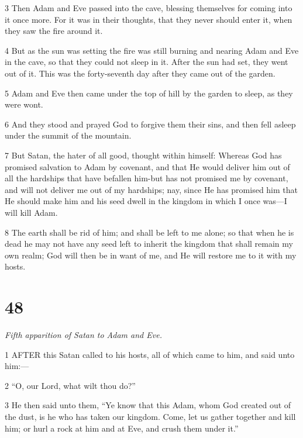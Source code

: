\par 3 Then Adam and Eve passed into the cave, blessing themselves for coming into it once more. For it was in their thoughts, that they never should enter it, when they saw the fire around it.

\par 4 But as the sun was setting the fire was still burning and nearing Adam and Eve in the cave, so that they could not sleep in it. After the sun had set, they went out of it. This was the forty-seventh day after they came out of the garden.

\par 5 Adam and Eve then came under the top of hill by the garden to sleep, as they were wont.

\par 6 And they stood and prayed God to forgive them their sins, and then fell asleep under the summit of the mountain.

\par 7 But Satan, the hater of all good, thought within himself: Whereas God has promised salvation to Adam by covenant, and that He would deliver him out of all the hardships that have befallen him-but has not promised me by covenant, and will not deliver me out of my hardships; nay, since He has promised him that He should make him and his seed dwell in the kingdom in which I once was—I will kill Adam.

\par 8 The earth shall be rid of him; and shall be left to me alone; so that when he is dead he may not have any seed left to inherit the kingdom that shall remain my own realm; God will then be in want of me, and He will restore me to it with my hosts.

\chapter{48}

\par \textit{Fifth apparition of Satan to Adam and Eve.}

\par 1 AFTER this Satan called to his hosts, all of which came to him, and said unto him:—

\par 2 “O, our Lord, what wilt thou do?”

\par 3 He then said unto them, “Ye know that this Adam, whom God created out of the dust, is he who has taken our kingdom. Come, let us gather together and kill him; or hurl a rock at him and at Eve, and crush them under it.”

